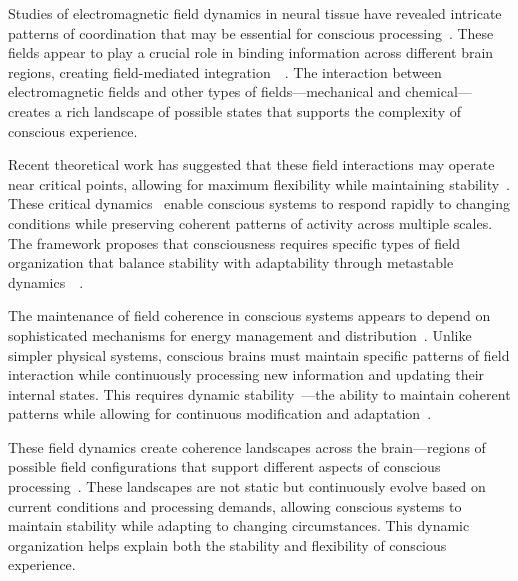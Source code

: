 Studies of electromagnetic field dynamics in neural tissue have revealed intricate patterns of coordination that may be essential for conscious processing~\cite{pinotsis2023cytoelectric}. These fields appear to play a crucial role in binding information across different brain regions, creating field-mediated integration~~\cite{hunt2024electromagnetic}. The interaction between electromagnetic fields and other types of fields—mechanical and chemical—creates a rich landscape of possible states that supports the complexity of conscious experience.

Recent theoretical work has suggested that these field interactions may operate near critical points, allowing for maximum flexibility while maintaining stability~\cite{kelso2012}. These critical dynamics~ enable conscious systems to respond rapidly to changing conditions while preserving coherent patterns of activity across multiple scales. The framework proposes that consciousness requires specific types of field organization that balance stability with adaptability through metastable dynamics~~\cite{van2025processes}.

The maintenance of field coherence in conscious systems appears to depend on sophisticated mechanisms for energy management and distribution~\cite{attwell2001}. Unlike simpler physical systems, conscious brains must maintain specific patterns of field interaction while continuously processing new information and updating their internal states. This requires dynamic stability~—the ability to maintain coherent patterns while allowing for continuous modification and adaptation~\cite{laughlin2001}.

These field dynamics create coherence landscapes across the brain—regions of possible field configurations that support different aspects of conscious processing~\cite{da2024mathematical}. These landscapes are not static but continuously evolve based on current conditions and processing demands, allowing conscious systems to maintain stability while adapting to changing circumstances. This dynamic organization helps explain both the stability and flexibility of conscious experience.

